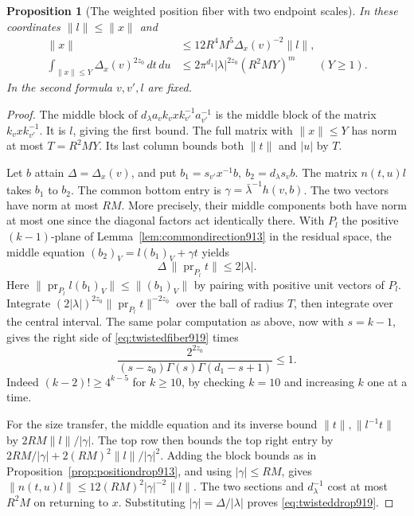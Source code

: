 \documentclass[a4paper,11pt]{article}
\newtheorem{proposition}{Proposition}[section]
\theoremstyle{definition}
\theoremstyle{remark}
\numberwithin{equation}{section}
\begin{document}
\begin{proposition}[The weighted position fiber with two endpoint scales]
\leavevmode\label{prop:twistedfiber919}
In these coordinates \(\|l\|\le\|x\|\) and
\begin{align}
  \|x\|&\le12 R^4 M^5 \Delta_x(v)^{-2}\|l\|,
                       \label{eq:twisteddrop919}\\
  \int_{\|x\|\le Y}\Delta_x(v)^{2z_0}\,dt\,du
       &\le 2\pi^{d_1}|\lambda|^{2z_0}(R^2 M Y)^m
            \qquad(Y\ge1)
                       \label{eq:twistedfiber919}.
\end{align}
In the second formula \(v,v',l\) are fixed.
\end{proposition}
\begin{proof}
The middle block of \(d_\lambda a_v k_v x
k_{v'}^{-1}a_{v'}^{-1}\) is the middle block of the matrix
\(k_v x k_{v'}^{-1}\). It is \(l\), giving the first bound.
The full matrix with \(\|x\|\le Y\) has norm at most
\(T=R^2 M Y\). Its last column bounds both \(\|t\|\) and
\(|u|\) by \(T\).

Let \(b\) attain \(\Delta=\Delta_x(v)\), and put
\(b_1=s_{v'}x^{-1}b,\ b_2=d_\lambda s_v b\). The matrix
\(n(t,u)l\) takes \(b_1\) to \(b_2\). The common bottom
entry is \(\gamma=\bar\lambda^{-1}h(v,b)\).
The two vectors have norm at most \(R M\). More precisely,
their middle components both have norm at most one since
the diagonal factors act identically there. With \(P_l\)
the positive \((k-1)\)-plane of Lemma~\ref{lem:commondirection913}
in the residual space, the middle equation
\((b_2)_V=l(b_1)_V+\gamma t\) yields
\[
        \Delta\,\|\operatorname{pr}_{P_l}t\|\le 2|\lambda|.
\]
Here \(\|\operatorname{pr}_{P_l}l(b_1)_V\|\le\|(b_1)_V\|\)
by pairing with positive unit vectors of \(P_l\).
Integrate \((2|\lambda|)^{2z_0}\|\operatorname{pr}_{P_l}t\|^{-2z_0}\)
over the ball of radius \(T\), then integrate over the central
interval. The same polar computation as above, now with
\(s=k-1\), gives the right side of \eqref{eq:twistedfiber919}
times
\[
       \frac{2^{2z_0}}
              {(s-z_0)\Gamma(s)\Gamma(d_1-s+1)}\le1 .
\]
Indeed \((k-2)!\ge 4^{k-5}\) for \(k\ge10\), by checking
\(k=10\) and increasing \(k\) one at a time.

For the size transfer, the middle equation and its inverse
bound \(\|t\|,\|l^{-1}t\|\) by \(2 R M\|l\|/|\gamma|\).
The top row then bounds the top right entry by
\(2RM/|\gamma|+2(RM)^2\|l\|/|\gamma|^2\). Adding the block
bounds as in Proposition~\ref{prop:positiondrop913}, and
using \(|\gamma|\le RM\), gives
\(\|n(t,u)l\|\le12(RM)^2 |\gamma|^{-2}\|l\|\).
The two sections and \(d_\lambda^{-1}\) cost at most
\(R^2M\) on returning to \(x\). Substituting
\(|\gamma|=\Delta/|\lambda|\) proves \eqref{eq:twisteddrop919}.
\end{proof}
\clearpage
\end{document}
